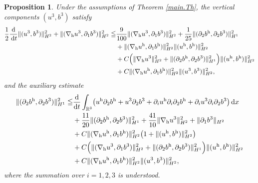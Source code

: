 \documentclass[11pt]{amsart}
\newtheorem{prop}[thm]{Proposition}
\theoremstyle{definition}
\newcommand{\R}{\mathbb{R}}
\newcommand{\dx}{\,{\rm d}x}
\newcommand{\dt}{\,{\rm d}t}
\numberwithin{equation}{section}
\begin{document}
\begin{prop}\label{v}
	Under the assumptions of Theorem \ref{main.Th}, the vertical components $(u^3,b^3)$ satisfy
	\begin{align}\label{u3b3H2}
		\frac12 \frac{\mathrm{d}}{\dt}\|(u^3,b^3)\|^2_{H^2}+\|(\nabla_{\mathrm{h}} u^3,\partial_1b^3)\|^2_{H^2}
		\leqq &\frac{9}{100} \|(\nabla_{\mathrm{h}} u^3,\partial_1b^3)\|_{H^2}^2+\frac{1}{25}\|(\partial_2b^\mathrm{h},\partial_2b^3)\|_{H^1}^2 \nonumber\\
		&+ \|(\nabla_{\mathrm{h}} u^\mathrm{h},\partial_1b^\mathrm{h})\|_{H^2}^2\|(u^\mathrm{h},b^\mathrm{h})\|_{H^2}^2\nonumber\\
		&+C\Bigl(\|\nabla_{\mathrm{h}} u^3\|_{H^2}^2+\|(\partial_2b^\mathrm{h},\partial_2b^3)\|_{H^1}^2\Bigr)\|(u^\mathrm{h},b^\mathrm{h})\|_{H^2}^2\nonumber\\
		&+C\|(\nabla_{\mathrm{h}} u^\mathrm{h},\partial_1b^\mathrm{h})\|_{H^{2}}^2\|(u^3,b^3)\|_{H^2}^2,
	\end{align}
	and the auxiliary estimate
	\begin{align}\label{p2bH1}
		\|(\partial_2b^\mathrm{h},\partial_2b^3)\|_{H^1}^2\leqq &\frac{\mathrm{d}}{\mathrm{d}t}\int_{\R^3}\bigl(u^\mathrm{h}\partial_2 b^\mathrm{h}+u^3\partial_2 b^3+\partial_{i}u^\mathrm{h}\partial_{i}\partial_{2}b^\mathrm{h}+\partial_{i}u^3\partial_{i}\partial_{2}b^3\bigr)\dx\nonumber\\
		&+\frac{11}{20}\|(\partial_{2}b^\mathrm{h},\partial_{2}b^3)\|_{H^1}^2+\frac{41}{10}\|\nabla_{\mathrm{h}} u^3\|_{H^2}^2+\|\partial_1b^3\|_{H^2}\nonumber\\
		&+C\|(\nabla_{\mathrm{h}} u^\mathrm{h},\partial_{1}b^\mathrm{h})\|_{H^{2}}^2\bigl(1+\|( u^\mathrm{h}, b^\mathrm{h})\|_{H^2}^2\bigr)\nonumber\\
		&+C\Bigl(\|(\nabla_{\mathrm{h}} u^3,\partial_1b^3)\|_{H^2}^2+\|(\partial_2b^\mathrm{h},\partial_2b^3)\|_{H^{1}}^2\Bigr)\|(u^\mathrm{h},b^\mathrm{h})\|_{H^{2}}^2\nonumber\\
		&+C\|(\nabla_{\mathrm{h}} u^\mathrm{h},\partial_1b^\mathrm{h})\|_{H^{2}}^2\|(u^3,b^3)\|_{H^2}^2,
	\end{align}
	where the summation over $i=1,2,3$ is understood.
\end{prop}
\end{document}
